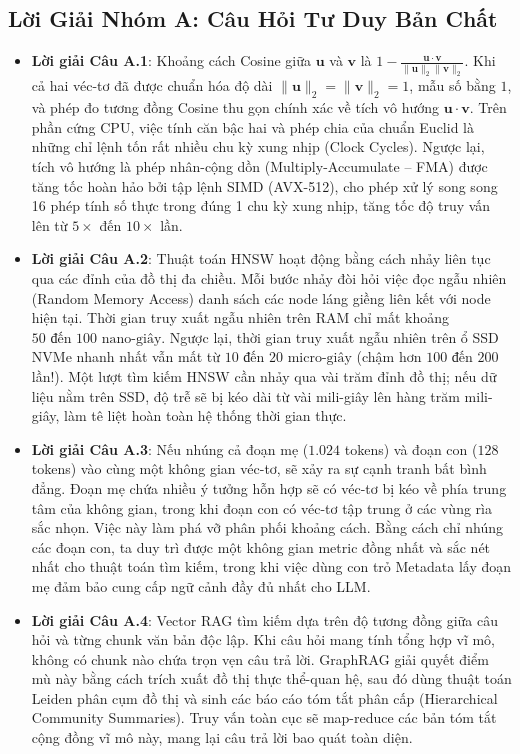 \subsection{Lời Giải Nhóm A: Câu Hỏi Tư Duy Bản Chất}
\begin{itemize}
  \item \textbf{Lời giải Câu A.1}:
  Khoảng cách Cosine giữa $\mathbf{u}$ và $\mathbf{v}$ là $1 - \frac{\mathbf{u} \cdot \mathbf{v}}{\|\mathbf{u}\|_2 \|\mathbf{v}\|_2}$. Khi cả hai véc-tơ đã được chuẩn hóa độ dài $\|\mathbf{u}\|_2 = \|\mathbf{v}\|_2 = 1$, mẫu số bằng $1$, và phép đo tương đồng Cosine thu gọn chính xác về tích vô hướng $\mathbf{u} \cdot \mathbf{v}$.
  Trên phần cứng CPU, việc tính căn bậc hai và phép chia của chuẩn Euclid là những chỉ lệnh tốn rất nhiều chu kỳ xung nhịp (Clock Cycles). Ngược lại, tích vô hướng là phép nhân-cộng dồn (Multiply-Accumulate -- FMA) được tăng tốc hoàn hảo bởi tập lệnh SIMD (AVX-512), cho phép xử lý song song 16 phép tính số thực trong đúng 1 chu kỳ xung nhịp, tăng tốc độ truy vấn lên từ $5\times$ đến $10\times$ lần.

  \item \textbf{Lời giải Câu A.2}:
  Thuật toán HNSW hoạt động bằng cách nhảy liên tục qua các đỉnh của đồ thị đa chiều. Mỗi bước nhảy đòi hỏi việc đọc ngẫu nhiên (Random Memory Access) danh sách các node láng giềng liên kết với node hiện tại.
  Thời gian truy xuất ngẫu nhiên trên RAM chỉ mất khoảng $50\text{ đến }100\text{ nano-giây}$. Ngược lại, thời gian truy xuất ngẫu nhiên trên ổ SSD NVMe nhanh nhất vẫn mất từ $10\text{ đến }20\text{ micro-giây}$ (chậm hơn $100\text{ đến }200$ lần!). Một lượt tìm kiếm HNSW cần nhảy qua vài trăm đỉnh đồ thị; nếu dữ liệu nằm trên SSD, độ trễ sẽ bị kéo dài từ vài mili-giây lên hàng trăm mili-giây, làm tê liệt hoàn toàn hệ thống thời gian thực.

  \item \textbf{Lời giải Câu A.3}:
  Nếu nhúng cả đoạn mẹ ($1.024$ tokens) và đoạn con ($128$ tokens) vào cùng một không gian véc-tơ, sẽ xảy ra sự cạnh tranh bất bình đẳng. Đoạn mẹ chứa nhiều ý tưởng hỗn hợp sẽ có véc-tơ bị kéo về phía trung tâm của không gian, trong khi đoạn con có véc-tơ tập trung ở các vùng rìa sắc nhọn. Việc này làm phá vỡ phân phối khoảng cách. Bằng cách chỉ nhúng các đoạn con, ta duy trì được một không gian metric đồng nhất và sắc nét nhất cho thuật toán tìm kiếm, trong khi việc dùng con trỏ Metadata lấy đoạn mẹ đảm bảo cung cấp ngữ cảnh đầy đủ nhất cho LLM.

  \item \textbf{Lời giải Câu A.4}:
  Vector RAG tìm kiếm dựa trên độ tương đồng giữa câu hỏi và từng chunk văn bản độc lập. Khi câu hỏi mang tính tổng hợp vĩ mô, không có chunk nào chứa trọn vẹn câu trả lời. GraphRAG giải quyết điểm mù này bằng cách trích xuất đồ thị thực thể-quan hệ, sau đó dùng thuật toán Leiden phân cụm đồ thị và sinh các báo cáo tóm tắt phân cấp (Hierarchical Community Summaries). Truy vấn toàn cục sẽ map-reduce các bản tóm tắt cộng đồng vĩ mô này, mang lại câu trả lời bao quát toàn diện.


\end{itemize}
